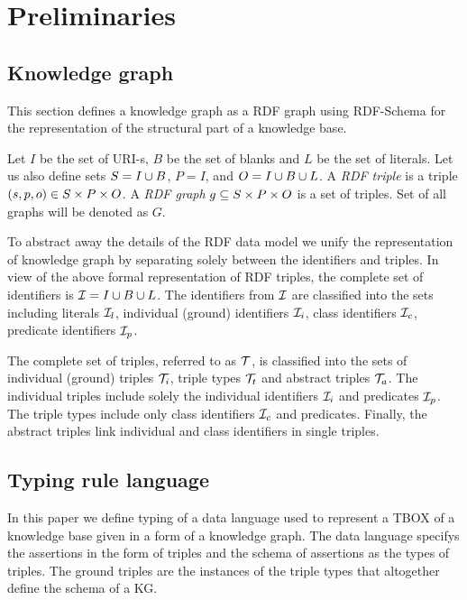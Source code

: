 \documentclass[runningheads]{llncs}
\newcommand{\I}{{\cal I}}
\newcommand{\T}{{\cal T}}
\begin{document}
\section{Preliminaries}


\subsection{Knowledge graph\label{sec:kg}}

This section defines a knowledge graph as a RDF graph \cite{rdf} using
RDF-Schema \cite{rdfschema} for the representation of the structural
part of a knowledge base. 

Let $I$ be the set of URI-s, $B$ be the set of blanks and $L$ be the
set of literals. Let us also define sets $S = I\cup\/B$, $P = I$, and
$O = I\cup\/B\cup\/L$. A \emph{RDF triple} is a triple
$(s,p,o)\in\/S\times\/P\times\/O$. A \emph{RDF graph}
$g\subseteq\/S\times\/P\times\/O$ is a set of triples. Set of all
graphs will be denoted as $G$.


To abstract away the details of the RDF data model we unify the
representation of knowledge graph by separating solely between the
identifiers and triples. In view of the above formal representation of
RDF triples, the complete set of identifiers is
$\I=I\cup\/B\cup\/L$. The identifiers from $\I$ are classified into
the sets including literals $\I_l$, individual (ground) identifiers
$\I_i$, class identifiers $\I_c$, predicate identifiers $\I_p$.

The complete set of triples, referred to as $\T$, is classified into
the sets of individual (ground) triples $\T_i$, triple types $\T_t$
and abstract triples $\T_a$. The individual triples include solely the
individual identifiers $\I_i$ and predicates $\I_p$. The triple types
include only class identifiers $\I_c$ and predicates. Finally, the
abstract triples link individual and class identifiers in single
triples.



\subsection{Typing rule language}

In this paper we define typing of a data language used to represent a
TBOX \cite{Brachman2004KnowledgeRR} of a knowledge base given in a
form of a knowledge graph. The data language specifys the assertions
in the form of triples and the schema of assertions as the types of
triples. The ground triples are the instances of the triple types that
altogether define the schema of a KG.
\end{document}
